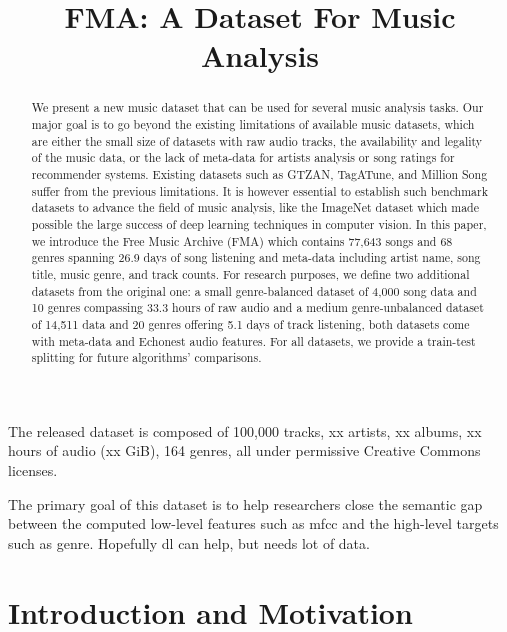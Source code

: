 \documentclass{article}
\title{FMA: A Dataset For Music Analysis}
\begin{document}
\maketitle

\begin{abstract}
We present a new music dataset that can be used for several music analysis tasks. Our major goal is to go beyond the existing limitations of available music datasets, which are either the small size of datasets with raw audio tracks, the availability and legality of the music data, or the lack of meta-data for artists analysis or song ratings for recommender systems. Existing datasets such as GTZAN, TagATune, and Million Song suffer from the previous limitations. It is however essential to establish such benchmark datasets to advance the field of music analysis, like the ImageNet dataset which made possible the large success of deep learning techniques in computer vision. In this paper, we introduce the Free Music Archive (FMA) which contains 77,643 songs and 68 genres spanning 26.9 days of song listening and meta-data including artist name, song title, music genre, and track counts. For research purposes, we define two additional datasets from the original one: a small genre-balanced dataset of 4,000 song data and 10 genres compassing 33.3 hours of raw audio and a medium genre-unbalanced dataset of 14,511 data and 20 genres offering 5.1 days of track listening, both datasets come with meta-data and Echonest audio features. For all datasets, we provide a train-test splitting for future algorithms' comparisons.
\end{abstract}


The released dataset is composed of 100,000 tracks, xx artists, xx albums, xx hours of audio (xx GiB), 164 genres, all under permissive Creative Commons licenses.


The primary goal of this dataset is to help researchers close the semantic gap between the computed low-level features such as mfcc and the high-level targets such as genre. Hopefully dl can help, but needs lot of data.


\section{Introduction and Motivation}
\end{document}
